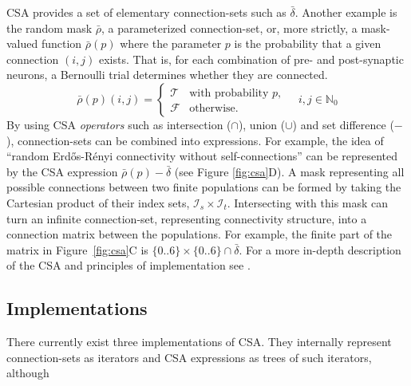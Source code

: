 \documentclass{frontiersSCNS} %
\newcommand{\Figure}[2]{Figure~\ref{#2}}
\newcommand{\Figure}[2]{Figure~#1}
\begin{document}
CSA provides a set of elementary connection-sets such as
$\bar{\delta}$. Another example is the random mask $\bar{\rho}$, a
parameterized connection-set, or, more strictly, a mask-valued
function $\bar{\rho}(p)$ where the parameter $p$ is the probability
that a given connection $(i, j)$ exists.  That is, for each
combination of pre- and post-synaptic neurons, a Bernoulli trial
determines whether they are connected.
\begin{equation*}
  \bar{\rho} (p) (i, j) =
  \begin{cases}
    \mathcal{T}& \text{with probability $p$},\\
    \mathcal{F}& \text{otherwise}.
  \end{cases}
  \quad i, j \in \mathbb{N}_0
\end{equation*}
By using CSA \emph{operators} such as intersection ($\cap$), union
($\cup$) and set difference ($-$), connection-sets can be combined into
expressions. For example, the idea of ``random Erd\H{o}s-R\'enyi
connectivity without self-connections'' can be represented by the CSA
expression $\bar{\rho}(p) - \bar{\delta}$ (see Figure
\ref{fig:csa}D). A mask representing all possible connections between
two finite populations can be formed by taking the Cartesian product
of their index sets, $\mathcal{I}_s \times
\mathcal{I}_t$. Intersecting with this mask can turn an infinite
connection-set, representing connectivity structure, into a connection
matrix between the populations. For example, the finite part of the
matrix in \Figure{1}{fig:csa}C is $\{0..6\} \times \{0..6\} \cap
\bar{\delta}$. For a more in-depth description of the CSA and
principles of implementation see \citet{djurfeldt12}.

\subsection{Implementations}\label{sec:impl}

There currently exist three implementations of CSA.  They internally
represent connection-sets as iterators and CSA expressions as trees of
such iterators, although
\end{document}
